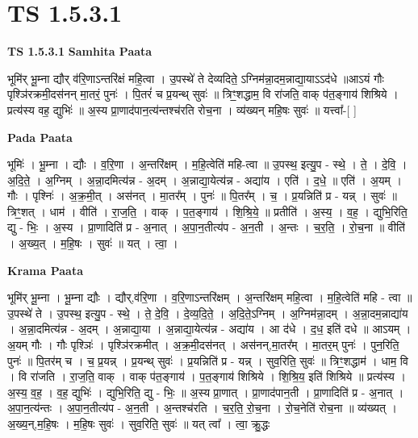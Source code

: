 \documentclass[17pt]{extarticle}
\begin{document}
\section*{ TS 1.5.3.1 }

\textbf{TS 1.5.3.1 } \newline
\textbf{Samhita Paata} \newline

भूमि॑र् भू॒म्ना द्यौर् व॑रि॒णाऽन्तरि॑क्षं महि॒त्वा । उ॒पस्थे॑ ते देव्यदिते॒ ऽग्निम॑न्ना॒दम॒न्नाद्या॒याऽऽद॑धे ॥आऽयं गौः पृश्ञि॑रक्रमी॒दस॑नन् मा॒तरं॒ पुनः॑ । पि॒तरं॑ च प्र॒यन्थ् सुवः॑ ॥ त्रिꣳ॒॒शद्धाम॒ वि रा॑जति॒ वाक् प॑त॒ङ्गाय॑ शिश्रिये । प्रत्य॑स्य वह॒ द्युभिः॑ ॥ अ॒स्य प्रा॒णाद॑पान॒त्य॑न्तश्च॑रति रोच॒ना । व्य॑ख्यन् महि॒षः सुवः॑ ॥ यत्त्वा᳚-[ ] \newline

\textbf{Pada Paata} \newline

भूमिः॑ । भू॒म्ना । द्यौः । व॒रि॒णा । अ॒न्तरि॑क्षम् । म॒हि॒त्वेति॑ महि-त्वा ॥ उ॒पस्थ॒ इत्यु॒प - स्थे॒ । ते॒ । दे॒वि॒ । अ॒दि॒ते॒ । अ॒ग्निम् । अ॒न्ना॒दमित्य॑न्न - अ॒दम् । अ॒न्नाद्या॒येत्य॑न्न - अद्या॑य । एति॑ । द॒धे॒ ॥ एति॑ । अ॒यम् । गौः । पृश्निः॑ । अ॒क्र॒मी॒त् । अस॑नत् । मा॒तर᳚म् । पुनः॑ ॥ पि॒तर᳚म् । च॒ । प्र॒यन्निति॑ प्र - यन्न् । सुवः॑ ॥ त्रिꣳ॒॒शत् । धाम॑ । वीति॑ । रा॒ज॒ति॒ । वाक् । प॒त॒ङ्गाय॑ । शि॒श्रि॒ये॒ ॥ प्रतीति॑ । अ॒स्य॒ । व॒ह॒ । द्युभि॒रिति॒ द्यु - भिः॒ । अ॒स्य । प्रा॒णादिति॑ प्र - अ॒नात् । अ॒पा॒न॒तीत्य॑प - अ॒न॒ती । अ॒न्तः । च॒र॒ति॒ । रो॒च॒ना ॥ वीति॑ । अ॒ख्य॒त् । म॒हि॒षः । सुवः॑ ॥ यत् । त्वा॒ ।  \newline


\textbf{Krama Paata} \newline

भूमि॑र् भू॒म्ना । भू॒म्ना द्यौः । द्यौर्,व॑रि॒णा । व॒रि॒णाऽन्तरि॑क्षम् । अ॒न्तरि॑क्षम् महि॒त्वा । म॒हि॒त्वेति॑ महि - त्वा ॥ उ॒पस्थे॑ ते । उ॒पस्थ॒ इत्यु॒प - स्थे॒ । ते॒ दे॒वि॒ । दे॒व्य॒दि॒ते॒ । अ॒दि॒ते॒ऽग्निम् । अ॒ग्निम॑न्ना॒दम् । अ॒न्ना॒दम॒न्नाद्या॑य । अ॒न्ना॒दमित्य॑न्न - अ॒दम् । अ॒न्नाद्या॒या । अ॒न्नाद्या॒येत्य॑न्न - अद्या॑य । आ द॑धे । द॒ध॒ इति॑ दधे ॥ आऽयम् । अ॒यम् गौः । गौः पृश्ञिः॑ । पृश्ञि॑रक्रमीत् । अ॒क्र॒मी॒दस॑नत् । अस॑नन्,मा॒तर᳚म् । मा॒तर॒म् पुनः॑ । पुन॒रिति॒ पुनः॑ ॥ पि॒तर॑म् च । च॒ प्र॒यन्न् । प्र॒यन्थ् सुवः॑ । प्र॒यन्निति॑ प्र - यन्न् । सुव॒रिति॒ सुवः॑ ॥ त्रिꣳ॒॒शद्धाम॑ । धाम॒ वि । वि रा॑जति । रा॒ज॒ति॒ वाक् । वाक् प॑त॒ङ्गाय॑ । प॒त॒ङ्गाय॑ शिश्रिये । शि॒श्रि॒य॒ इति॑ शिश्रिये ॥ प्रत्य॑स्य । अ॒स्य॒ व॒ह॒ । व॒ह॒ द्युभिः॑ । द्युभि॒रिति॒ द्यु - भिः॒ ॥ अ॒स्य प्रा॒णात् । प्रा॒णाद॑पान॒ती । प्रा॒णादिति॑ प्र - अ॒नात् । अ॒पा॒न॒त्य॑न्तः । अ॒पा॒न॒तीत्य॑प - अ॒न॒ती । अ॒न्तश्च॑रति । च॒र॒ति॒ रो॒च॒ना । रो॒च॒नेति॑ रोच॒ना ॥ व्य॑ख्यत् । अ॒ख्य॒न्,म॒हि॒षः । म॒हि॒षः सुवः॑ । सुव॒रिति॒ सुवः॑ ॥ यत् त्वा᳚ । त्वा॒ क्रु॒द्धः \newline
\end{document}
